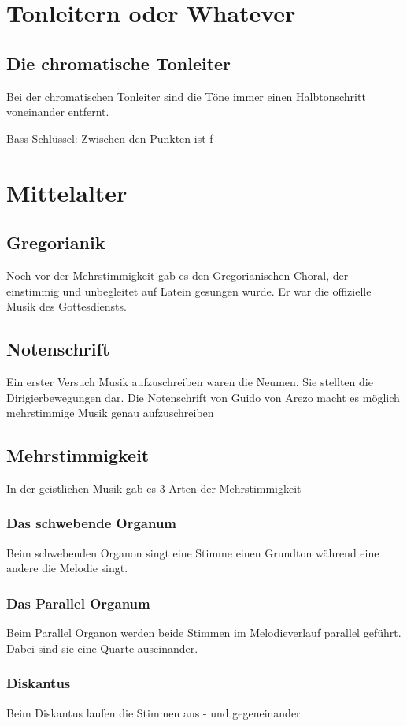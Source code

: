 \documentclass{article}
\begin{document}
\section*{Tonleitern oder Whatever}
\subsection*{Die chromatische Tonleiter}
Bei der chromatischen Tonleiter sind die Töne immer einen Halbtonschritt
voneinander entfernt.

Bass-Schlüssel: Zwischen den Punkten ist f
\section*{Mittelalter}
\subsection*{Gregorianik}
Noch vor der Mehrstimmigkeit gab es den Gregorianischen
Choral, der einstimmig und unbegleitet auf Latein gesungen wurde. Er war die
offizielle Musik des Gottesdiensts.

\subsection*{Notenschrift}
Ein erster Versuch Musik aufzuschreiben waren die Neumen.
Sie stellten die Dirigierbewegungen dar.
Die Notenschrift von Guido von Arezo macht es möglich
mehrstimmige Musik genau aufzuschreiben

\subsection*{Mehrstimmigkeit}
In der geistlichen Musik gab es 3 Arten der Mehrstimmigkeit
\subsubsection*{Das schwebende Organum}
Beim schwebenden Organon singt eine Stimme einen Grundton
während eine andere die Melodie singt.
\subsubsection*{Das Parallel Organum}
Beim Parallel Organon werden beide Stimmen im Melodieverlauf
parallel geführt. Dabei sind sie eine Quarte auseinander.
\subsubsection*{Diskantus}
Beim Diskantus laufen die Stimmen aus - und gegeneinander.
\end{document}
